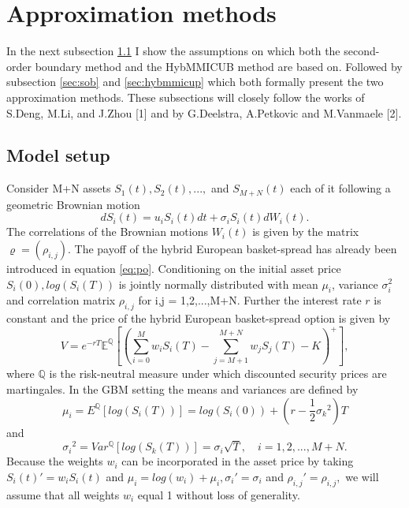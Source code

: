 \documentclass[a4paper]{article}
\begin{document}
\newpage
\section{Approximation methods}
\label{sec:am}
In the next subsection \ref{sec:ms} I show the assumptions on which both the second-order boundary method and the HybMMICUB method are based on. Followed by subsection \ref{sec:sob} and \ref{sec:hybmmicup} which both formally present the two approximation methods. These subsections will closely follow the works of S.Deng, M.Li, and J.Zhou [1] and by G.Deelstra, A.Petkovic and M.Vanmaele [2].

\subsection{Model setup}
\label{sec:ms}
Consider M+N assets $S_1(t), S_2(t), ...,$ and $S_{M+N}(t)$ each of it following a geometric Brownian motion
$$dS_i(t) = u_iS_i(t)dt + \sigma_iS_i(t)dW_i(t).$$
The correlations of the Brownian motions $W_i(t)$ is given by the matrix $\varrho=(\rho_{i,j})$. 
The payoff of the hybrid European basket-spread has already been introduced in equation \ref{eq:po}. Conditioning on the initial asset price $S_i(0), log(S_i(T))$ is jointly normally distributed with mean $\mu_i$, variance $\sigma_i^2$ and correlation matrix $\rho_{i,j}$ for i,j = 1,2,...,M+N. 
Further the interest rate $r$ is constant and the price of the hybrid European basket-spread option is given by
\begin{equation}
\label{eq:mg}
V = e^{-rT}\mathbb{E}^{\mathbb{Q}}[(\sum_{i=0}^M w_iS_i(T) - \sum_{j=M+1}^{M+N} w_jS_j(T) - K)^+],
\end{equation}
where $\mathbb{Q}$ is the risk-neutral measure under which discounted security prices are martingales.
In the GBM setting the means and variances are defined by 
$$\mu_i = E^\mathbb{Q}[log(S_i(T))] = log(S_i(0)) + (r-\frac{1}{2}{\sigma_k}^2)T$$ 
and
$${\sigma_i}^2 = Var^\mathbb{Q}[log(S_k(T))] = \sigma_i\sqrt{T}, \quad i=1,2,...,M+N.$$
Because the weights $w_i$ can be incorporated in the asset price by taking $S_i(t)'=w_iS_i(t)$ and $\mu_i=log(w_i)+\mu_i, \sigma_i'=\sigma_i$ and $\rho_{i,j}'=\rho_{i,j},$ we will assume that all weights $w_i$ equal 1 without loss of generality.
\end{document}

